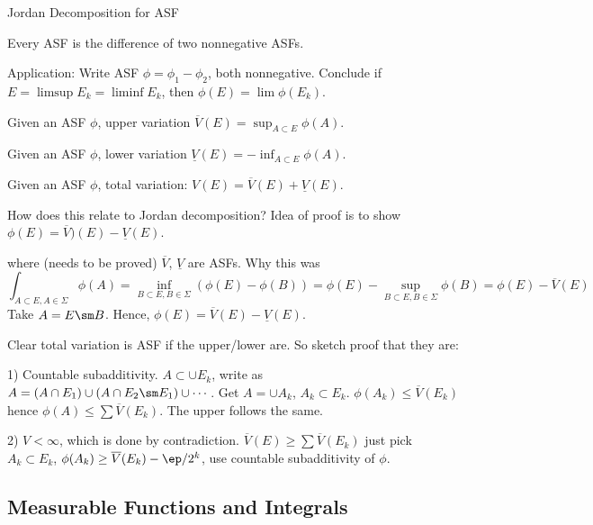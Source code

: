 Jordan Decomposition for ASF 

Every ASF is the difference of two nonnegative ASFs. 

Application: Write ASF $\phi = \phi_1 - \phi_2$, both nonnegative. Conclude if $E= \limsup E_k= \liminf E_k$, then $\phi(E)= \lim \phi(E_k)$. 


\begin{dfn}
Given an ASF $\phi$, upper variation $\overline{V}(E)= \sup_{A \subset E} \phi(A)$. 
\end{dfn}

\begin{dfn}
Given an ASF $\phi$, lower variation $\underline{V}(E)= - \inf_{A \subset E} \phi(A)$. 
\end{dfn}

\begin{dfn}
Given an ASF $\phi$, total variation: $V(E)= \overline{V}(E) + \underline{V}(E)$.
\end{dfn}

How does this relate to Jordan decomposition? Idea of proof is to show $\phi(E)= \overline{V})(E) - \underline{V}(E)$. 

where (needs to be proved) $\overline{V}$, $\underline{V}$ are ASFs. Why this was
	\[
	\int_{A \subset E, A \in \Sigma} \phi(A) = \inf_{B \subset E, B \in \Sigma} (\phi(E) - \phi(B)) = \phi(E) - \sup_{B \subset E, B \in \Sigma} \phi(B) = \phi(E) - \overline{V}(E)
	\]
Take $A= E \sm B$. Hence, $\phi(E)= \overline{V}(E) - \underline{V}(E)$. 


Clear total variation is ASF if the upper/lower are. So sketch proof that they are:

1) Countable subadditivity. 
$A \subset \cup E_k$, write as $A= (A \cap E_1) \cup (A \cap E_2 \sm E_1) \cup \cdots$. Get $A= \cup A_k$, $A_k \subset E_k$. $\phi(A_k) \leq \overline{V}(E_k)$ hence $\phi(A) \leq \sum \overline{V} (E_k)$. The upper follows the same.

2) $V< \infty$, which is done by contradiction. 
$\overline{V}(E) \geq \sum \overline{V}(E_k)$ just pick $A_k \subset E_k$, $\phi(A_k) \geq \overline{V}(E_k) - \ep/2^k$, use countable subadditivity of $\phi$. 






\subsection{Measurable Functions and Integrals}


